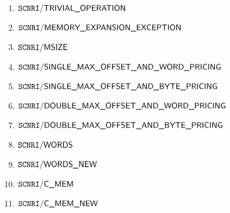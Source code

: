 \begin{enumerate}
	\item $\mxpScenarioTrivialOperation              $
	\item $\mxpScenarioMemoryExpansionException      $
	\item $\mxpScenarioMsize                         $
	\item $\mxpScenarioSingleMaxOffsetAndWordPricing $
	\item $\mxpScenarioSingleMaxOffsetAndBytePricing $
	\item $\mxpScenarioDoubleMaxOffsetAndWordPricing $
	\item $\mxpScenarioDoubleMaxOffsetAndBytePricing $
	\item $\mxpScenarioWords                         $
	\item $\mxpScenarioWordsNew                      $
	\item $\mxpScenarioCmem                          $
	\item $\mxpScenarioCmemNew                       $
\end{enumerate}
